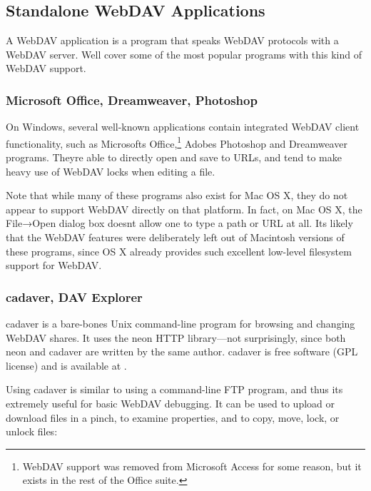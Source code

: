 \subsection{Standalone WebDAV
Applications}\label{svn.webdav.clients.standalone}

A WebDAV application is a program that speaks WebDAV protocols with a
WebDAV server. We\textquotesingle ll cover some of the most popular
programs with this kind of WebDAV support.

\subsubsection{Microsoft Office, Dreamweaver,
Photoshop}\label{svn.webdav.clients.standalone.windows}

On Windows, several well-known applications contain integrated WebDAV
client functionality, such as Microsoft\textquotesingle s
Office,\footnote{WebDAV support was removed from Microsoft Access for
  some reason, but it exists in the rest of the Office suite.}
Adobe\textquotesingle s Photoshop and Dreamweaver programs.
They\textquotesingle re able to directly open and save to URLs, and tend
to make heavy use of WebDAV locks when editing a file.

Note that while many of these programs also exist for Mac OS X, they do
not appear to support WebDAV directly on that platform. In fact, on Mac
OS X, the File→Open dialog box doesn\textquotesingle t allow one to type
a path or URL at all. It\textquotesingle s likely that the WebDAV
features were deliberately left out of Macintosh versions of these
programs, since OS X already provides such excellent low-level
filesystem support for WebDAV.

\subsubsection{cadaver, DAV
Explorer}\label{svn.webdav.clients.standalone.free}

cadaver is a bare-bones Unix command-line program for browsing and
changing WebDAV shares. It uses the neon HTTP library---not
surprisingly, since both neon and cadaver are written by the same
author. cadaver is free software (GPL license) and is available at
\href{https://notroj.github.io/cadaver/}{}.

Using cadaver is similar to using a command-line FTP program, and thus
it\textquotesingle s extremely useful for basic WebDAV debugging. It can
be used to upload or download files in a pinch, to examine properties,
and to copy, move, lock, or unlock files:

